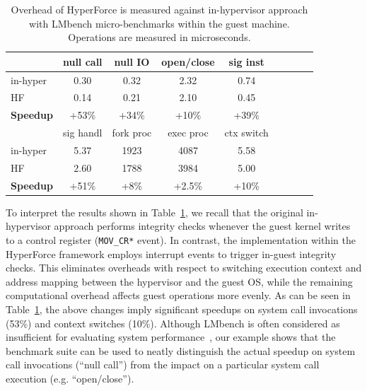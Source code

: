 \begin{table}[htdp]
\begin{center}
\begin{tabular}{| l | c | c | c | c | c | c | c | c |  }
\hline
  ~            & null call  & null IO & open/close & sig inst   \\  
\hline
in-hyper & 0.30 & 0.32 & 2.32 & 0.74   \\
HF    & 0.14 & 0.21 & 2.10 & 0.45  \\  
\hline
\bf{Speedup}      &  +53\%   & +34\%    &  +10\%    & +39\%      \\
\hline
\hline

~ & sig handl & fork proc & exec proc & ctx switch \\
\hline
in-hyper 			& 5.37 & 1923 & 4087 & 5.58 \\
HF 		& 2.60 & 1788 & 3984 & 5.00 \\

\hline
\bf{Speedup}			& +51\%    & +8\%       & +2.5\%     &  +10\% \\
\hline

\end{tabular}
\caption{Overhead of HyperForce is measured against in-hypervisor approach with
LMbench micro-benchmarks within the guest machine. Operations are measured in microseconds.}
\vspace{0.3cm}
\end{center}
\label{guestmicro}
\end{table}%



To interpret the results shown in Table~\ref{guestmicro}, we recall that the original in-hypervisor approach performs integrity checks whenever the guest kernel writes to a control register (\texttt{MOV\_CR*} event). 
%
In contrast, the implementation within the HyperForce framework employs interrupt events to trigger in-guest integrity checks. This eliminates overheads with respect to switching execution context and address mapping between the hypervisor and the guest OS, while the remaining computational overhead affects guest operations more evenly. As can be seen in Table~\ref{guestmicro}, the above changes imply significant speedups on system call invocations (53\%) and context switches (10\%). Although LMbench is often considered as insufficient for evaluating system performance~\cite{lmbenchevil}, our example shows that the benchmark suite can be used to neatly distinguish the actual speedup on system call invocations (\enquote{null call}) from the impact on a particular system call execution (e.g. \enquote{open/close}).

